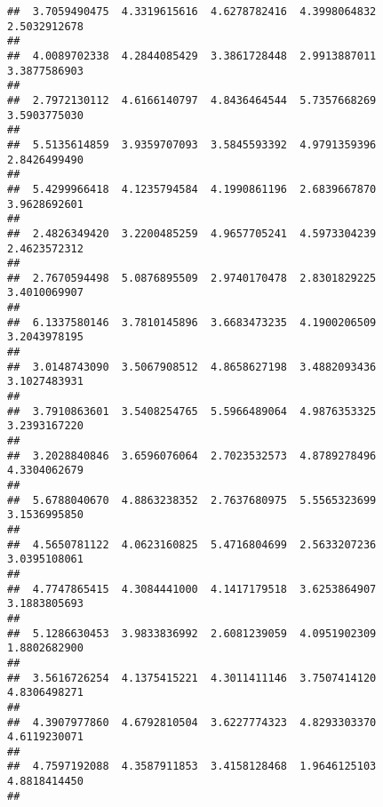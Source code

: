 \documentclass[]{article}
\begin{document}
\begin{verbatim}
##  3.7059490475  4.3319615616  4.6278782416  4.3998064832  2.5032912678 
##                                                                       
##  4.0089702338  4.2844085429  3.3861728448  2.9913887011  3.3877586903 
##                                                                       
##  2.7972130112  4.6166140797  4.8436464544  5.7357668269  3.5903775030 
##                                                                       
##  5.5135614859  3.9359707093  3.5845593392  4.9791359396  2.8426499490 
##                                                                       
##  5.4299966418  4.1235794584  4.1990861196  2.6839667870  3.9628692601 
##                                                                       
##  2.4826349420  3.2200485259  4.9657705241  4.5973304239  2.4623572312 
##                                                                       
##  2.7670594498  5.0876895509  2.9740170478  2.8301829225  3.4010069907 
##                                                                       
##  6.1337580146  3.7810145896  3.6683473235  4.1900206509  3.2043978195 
##                                                                       
##  3.0148743090  3.5067908512  4.8658627198  3.4882093436  3.1027483931 
##                                                                       
##  3.7910863601  3.5408254765  5.5966489064  4.9876353325  3.2393167220 
##                                                                       
##  3.2028840846  3.6596076064  2.7023532573  4.8789278496  4.3304062679 
##                                                                       
##  5.6788040670  4.8863238352  2.7637680975  5.5565323699  3.1536995850 
##                                                                       
##  4.5650781122  4.0623160825  5.4716804699  2.5633207236  3.0395108061 
##                                                                       
##  4.7747865415  4.3084441000  4.1417179518  3.6253864907  3.1883805693 
##                                                                       
##  5.1286630453  3.9833836992  2.6081239059  4.0951902309  1.8802682900 
##                                                                       
##  3.5616726254  4.1375415221  4.3011411146  3.7507414120  4.8306498271 
##                                                                       
##  4.3907977860  4.6792810504  3.6227774323  4.8293303370  4.6119230071 
##                                                                       
##  4.7597192088  4.3587911853  3.4158128468  1.9646125103  4.8818414450 
##                                                                       

\end{verbatim}
\end{document}
